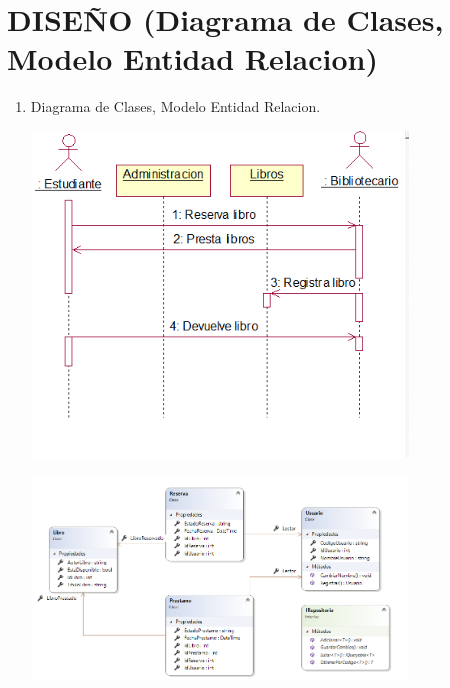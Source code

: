 \section{ DISEÑO (Diagrama de Clases, Modelo Entidad Relacion)} 

\begin{enumerate}[1.]
	\item Diagrama de Clases, Modelo Entidad Relacion.
    


	\begin{center}
	\includegraphics[width=10cm]{./Imagenes/img3} 
	\end{center}
	
	\begin{center}
	\includegraphics[width=10cm]{./Imagenes/img7} 
	\end{center}
	
\end{enumerate} 
